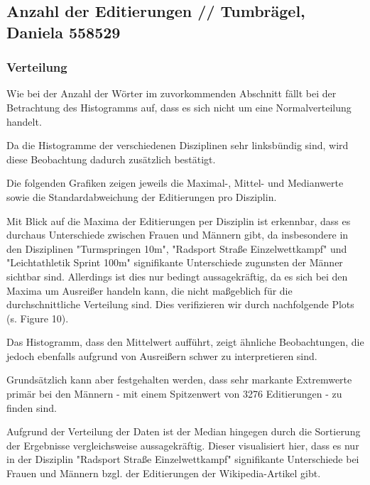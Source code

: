 \documentclass[11pt]{article}
\begin{document}
\subsection{Anzahl der Editierungen // Tumbrägel, Daniela 558529}
\subsubsection{Verteilung}
Wie bei der Anzahl der Wörter im zuvorkommenden Abschnitt fällt bei der Betrachtung des Histogramms auf, dass es sich nicht um eine Normalverteilung handelt.

Da die Histogramme der verschiedenen Disziplinen sehr linksbündig sind, wird diese Beobachtung dadurch zusätzlich bestätigt. 

Die folgenden Grafiken zeigen jeweils die Maximal-, Mittel- und Medianwerte sowie die Standardabweichung der Editierungen pro Disziplin. 

Mit Blick auf die Maxima der Editierungen per Disziplin ist erkennbar, dass es durchaus Unterschiede zwischen Frauen und Männern gibt, da insbesondere in den Disziplinen "Turmspringen 10m", "Radsport Straße Einzelwettkampf" und "Leichtathletik Sprint 100m" signifikante Unterschiede zugunsten der Männer sichtbar sind. Allerdings ist dies nur bedingt aussagekräftig, da es sich bei den Maxima um Ausreißer handeln kann, die nicht maßgeblich für die durchschnittliche Verteilung sind. Dies verifizieren wir durch nachfolgende Plots (s. Figure 10).

Das Histogramm, dass den Mittelwert aufführt, zeigt ähnliche Beobachtungen, die jedoch ebenfalls aufgrund von Ausreißern schwer zu interpretieren sind.

Grundsätzlich kann aber festgehalten werden, dass sehr markante Extremwerte primär bei den Männern - mit einem Spitzenwert von 3276 Editierungen - zu finden sind.

Aufgrund der Verteilung der Daten ist der Median hingegen durch die Sortierung der Ergebnisse vergleichsweise aussagekräftig. Dieser visualisiert hier, dass es nur in der Disziplin "Radsport Straße Einzelwettkampf" signifikante Unterschiede bei Frauen und Männern bzgl. der Editierungen der Wikipedia-Artikel gibt.
\end{document}
